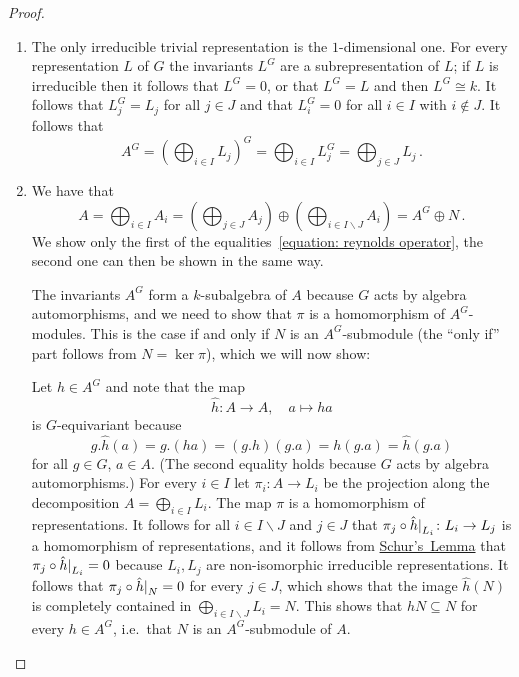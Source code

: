 \begin{proof}
  \leavevmode
  \begin{enumerate}
    \item
      The only irreducible trivial representation is the $1$-dimensional one.
      For every representation $L$ of $G$ the invariants $L^G$ are a subrepresentation of $L$;
      if $L$ is irreducible then it follows that $L^G = 0$, or that $L^G = L$ and then $L^G \cong k$.
      It follows that $L_j^G = L_j$ for all $j \in J$ and that $L_i^G = 0$ for all $i \in I$ with $i \notin J$.
      It follows that
      \[
          A^G
        = \left( \bigoplus_{i \in I} L_j \right)^G
        = \bigoplus_{i \in I} L_j^G
        = \bigoplus_{j \in J} L_j \,.
      \]
    \item
      We have that
      \[
          A
        = \bigoplus_{i \in I} A_i
        = \left( \bigoplus_{j \in J} A_j \right)
          \oplus
          \left( \bigoplus_{i \in I \smallsetminus J} A_i \right)
        = A^G \oplus N \,.
      \]
      We show only the first of the equalities~\eqref{equation: reynolds operator}, the second one can then be shown in the same way.
      
      The invariants $A^G$ form a $k$-subalgebra of $A$ because $G$ acts by algebra automorphisms, and we need to show that $\pi$ is a homomorphism of $A^G$-modules.
      This is the case if and only if $N$ is an $A^G$-submodule (the \enquote{only if} part follows from $N = \ker \pi$), which we will now show:
      
      Let $h \in A^G$ and note that the map
      \[
                \hat{h}
        \colon  A
        \to     A,
        \quad   a
        \mapsto ha
      \]
      is $G$-equivariant because
      \[
          g.\hat{h}(a)
        = g.(ha)
        = (g.h)(g.a)
        = h(g.a)
        = \hat{h}(g.a)
      \]
      for all $g \in G$, $a \in A$.
      (The second equality holds because $G$ acts by algebra automorphisms.)
      For every $i \in I$ let $\pi_i \colon A \to L_i$ be the projection along the decomposition $A = \bigoplus_{i \in I} L_i$.
      The map $\pi$ is a homomorphism of representations.
      It follows for all $i \in I \smallsetminus J$ and $j \in J$ that $\restrict{\pi_j \circ \hat{h}}{L_i} \colon L_i \to L_j$ is a homomorphism of representations, and it follows from \hyperref[corollary: Schurs Lemma]{Schur’s~Lemma} that $\restrict{\pi_j \circ \hat{h}}{L_i} = 0$ because $L_i, L_j$ are non-isomorphic irreducible representations.
      It follows that $\restrict{\pi_j \circ \hat{h}}{N} = 0$ for every $j \in J$, which shows that the image $\hat{h}(N)$ is completely contained in $\bigoplus_{i \in I \smallsetminus J} L_i = N$.
      This shows that $hN \subseteq N$ for every $h \in A^G$, i.e.\ that $N$ is an $A^G$-submodule of $A$.
    \qedhere
  \end{enumerate}
\end{proof}


